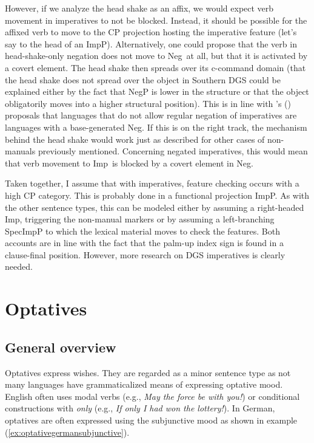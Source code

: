 \noindent However, if we analyze the head shake as an affix, we would expect verb movement in imperatives to not be blocked. Instead, it should be possible for the affixed verb to move to the CP projection hosting the imperative feature (let's say to the head of an ImpP). Alternatively, one could propose that the verb in head-shake-only negation does not move to Neg\textdegree\ at all, but that it is activated by a covert element. The head shake then spreads over its c-command domain (that the head shake does not spread over the object in Southern DGS could be explained either by the fact that NegP is lower in the structure or that the object obligatorily moves into a higher structural position). This is in line with \citeauthor{zeijlstra2004sentential}'s (\citeyear{zeijlstra2004sentential}) proposals that languages that do not allow regular negation of imperatives are languages with a base-generated Neg\textdegree . If this is on the right track, the mechanism behind the head shake would work just as described for other cases of non-manuals previously mentioned. Concerning negated imperatives, this would mean that verb movement to Imp\textdegree\ is blocked by a covert element in Neg\textdegree .


Taken together, I assume that with imperatives, feature checking occurs with a high CP category. This is probably done in a functional projection ImpP. As with the other sentence types, this can be modeled either by assuming a right-headed Imp\textdegree , triggering the non-manual markers or by assuming a left-branching SpecImpP to which the lexical material moves to check the features. Both accounts are in line with the fact that the palm-up index sign is found in a clause-final position. However, more research on DGS imperatives is clearly needed.



\section{Optatives}\label{opt}
\subsection{General overview}
Optatives express wishes. They are regarded as a minor sentence type as not many languages have grammaticalized means of expressing optative mood. English often uses modal verbs (e.g., \textit{May the force be with you!}) or conditional constructions with \textit{only} (e.g., \textit{If only I had won the lottery!}). In German, optatives are often expressed using the subjunctive mood as shown in example (\ref{ex:optativegermansubjunctive}).


